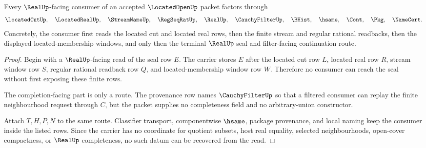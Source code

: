 \begin{theorem}
\label{thm:located-open-realup-consumer-route}
Every $\RealUp$-facing consumer of an accepted $\LocatedOpenUp$ packet factors
through
$$
\LocatedCutUp,\quad \LocatedRealUp,\quad \StreamNameUp,\quad
\RegSeqRatUp,\quad \RealUp,\quad \CauchyFilterUp,\quad
\BHist,\quad \hsame,\quad \Cont,\quad \Pkg,\quad \NameCert .
$$
Concretely, the consumer first reads the located cut and located real rows,
then the finite stream and regular rational readbacks, then the displayed
located-membership windows, and only then the terminal $\RealUp$ seal and
filter-facing continuation route.
\end{theorem}
\begin{proof}
Begin with a $\RealUp$-facing read of the seal row $E$. The carrier stores $E$
after the located cut row $L$, located real row $R$, stream window row $S$,
regular rational readback row $Q$, and located-membership window row $W$.
Therefore no consumer can reach the seal without first exposing these finite
rows.

The completion-facing part is only a route. The provenance row names
$\CauchyFilterUp$ so that a filtered consumer can replay the finite
neighbourhood request through $C$, but the packet supplies no completeness
field and no arbitrary-union constructor.

Attach $T,H,P,N$ to the same route. Classifier transport, componentwise
$\hsame$, package provenance, and local naming keep the consumer inside the
listed rows. Since the carrier has no coordinate for quotient subsets, host
real equality, selected neighbourhoods, open-cover compactness, or
$\RealUp$ completeness, no such datum can be recovered from the read.
\end{proof}

